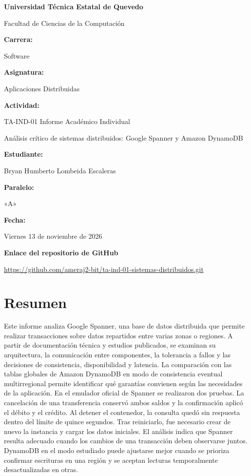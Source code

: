 \documentclass[11pt,a4paper]{article}
\begin{document}
\begin{titlepage}
\thispagestyle{empty}
\centering
{\Large\bfseries Universidad Técnica Estatal de Quevedo\par}
\vspace{0.5em}
{\large Facultad de Ciencias de la Computación\par}
\vfill
\textbf{Carrera:}\par\smallskip
Software\par
\vfill
\textbf{Asignatura:}\par\smallskip
Aplicaciones Distribuidas\par
\vfill
\textbf{Actividad:}\par\smallskip
TA-IND-01 \textperiodcentered{} Informe Académico Individual\par
\smallskip
Análisis crítico de sistemas distribuidos: Google Spanner y Amazon DynamoDB\par
\vfill
\textbf{Estudiante:}\par\smallskip
Bryan Humberto Lombeida Escaleras\par
\vfill
\textbf{Paralelo:}\par\smallskip
«A»\par
\vfill
\textbf{Fecha:}\par\smallskip
Viernes 13 de noviembre de 2026\par
\vfill
\textbf{Enlace del repositorio de GitHub}\par\smallskip
{\footnotesize\sffamily
\mbox{\href{https://github.com/ameraj2-bit/ta-ind-01-sistemas-distribuidos.git}{https://github.com/ameraj2-bit/ta-ind-01-sistemas-distribuidos.git}}\par}
\vfill
\end{titlepage}
\setcounter{page}{1}

\section*{Resumen}
Este informe analiza Google Spanner, una base de datos distribuida que permite realizar transacciones sobre datos repartidos entre varias zonas o regiones. A partir de documentación técnica y estudios publicados, se examinan su arquitectura, la comunicación entre componentes, la tolerancia a fallos y las decisiones de consistencia, disponibilidad y latencia. La comparación con las tablas globales de Amazon DynamoDB en modo de consistencia eventual multirregional permite identificar qué garantías convienen según las necesidades de la aplicación. En el emulador oficial de Spanner se realizaron dos pruebas. La cancelación de una transferencia conservó ambos saldos y la confirmación aplicó el débito y el crédito. Al detener el contenedor, la consulta quedó sin respuesta dentro del límite de quince segundos. Tras reiniciarlo, fue necesario crear de nuevo la instancia y cargar los datos iniciales. El análisis indica que Spanner resulta adecuado cuando los cambios de una transacción deben observarse juntos. DynamoDB en el modo estudiado puede ajustarse mejor cuando se prioriza confirmar escrituras en una región y se aceptan lecturas temporalmente desactualizadas en otras.
\end{document}
